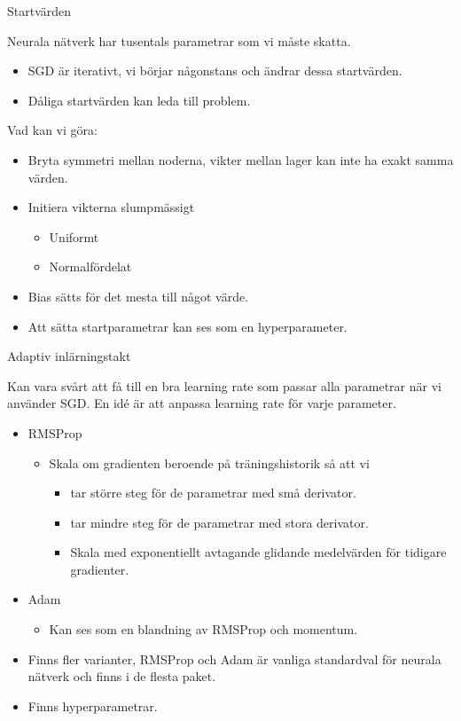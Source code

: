 \documentclass[10pt,english]{beamer}
\begin{document}
\begin{frame}{Startvärden}
    
    Neurala nätverk har tusentals parametrar som vi måste skatta.
    \begin{itemize}
        \item SGD är iterativt, vi börjar någonstans och ändrar dessa startvärden.
        \item Dåliga startvärden kan leda till problem.
    \end{itemize}
    Vad kan vi göra:
    \begin{itemize}
        \item Bryta symmetri mellan noderna, vikter mellan lager kan inte ha exakt samma värden.
        \item Initiera vikterna slumpmässigt
        \begin{itemize}
            \item Uniformt
            \item Normalfördelat
        \end{itemize}
        \item Bias sätts för det mesta till något värde.
        \item Att sätta startparametrar kan ses som en hyperparameter.
    \end{itemize}

\end{frame}

\begin{frame}{Adaptiv inlärningstakt}

    Kan vara svårt att få till en bra learning rate som passar alla parametrar när vi använder SGD. En idé är att anpassa learning rate för varje parameter.
    \begin{itemize}
        \item RMSProp
        \begin{itemize}
            \item Skala om gradienten beroende på träningshistorik så att vi
            \begin{itemize}
                \item tar större steg för de parametrar med små derivator.
                \item tar mindre steg för de parametrar med stora derivator.
                \item Skala med exponentiellt avtagande glidande medelvärden för tidigare gradienter.
            \end{itemize}
        \end{itemize}
        \item Adam
        \begin{itemize}
            \item Kan ses som en blandning av RMSProp och momentum.
        \end{itemize}
        \item Finns fler varianter, RMSProp och Adam är vanliga standardval för neurala nätverk och finns i de flesta paket.
        \item Finns hyperparametrar.
    \end{itemize}
    
\end{frame}
\end{document}
